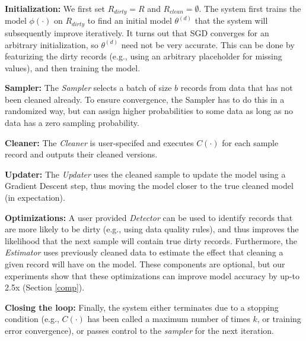 \vspace{0.25em}

\noindent \textbf{Initialization: } We first set $R_{dirty} = R$ and $R_{clean} = \emptyset$.
The system first trains the model $\phi(\cdot)$ on $R_{dirty}$ to find an initial model $\theta^{(d)}$ that the system will subsequently improve iteratively.
It turns out that SGD converges for an arbitrary initialization, so $\theta^{(d)}$ need not be very accurate. This can be done by featurizing the dirty records (e.g., using an arbitrary placeholder for missing values), and then training the model. 

\vspace{0.25em}

\noindent \textbf{Sampler: } The {\it Sampler} selects a batch of size $b$ records from data that has not been cleaned already. To ensure convergence, the Sampler has to do this in a randomized way, but can assign higher probabilities to some data as long as no data has a zero sampling probability.

\vspace{0.25em}

\noindent \textbf{Cleaner: } The {\it Cleaner} is user-specifed and executes $C(\cdot)$ for each sample record and outputs their cleaned versions.

\vspace{0.25em}

\noindent \textbf{Updater: }  The {\it Updater} uses the cleaned sample to update the model using a Gradient Descent step, thus moving the model closer to the true cleaned model (in expectation).

\vspace{0.25em}

\noindent \textbf{Optimizations: } A user provided {\it Detector} can be used to identify records that are more likely to be dirty (e.g., using data quality rules), and thus improves the likelihood that the next sample will contain true dirty records. Furthermore, the {\it Estimator} uses previously cleaned data to estimate the effect that cleaning a given record will have on the model. These components are optional, but our experiments show that these optimizations can improve model accuracy by up-to 2.5x (Section \ref{comp}).

\vspace{0.25em}

\noindent \textbf{Closing the loop: } Finally, the system either terminates due to a stopping condition (e.g., $C(\cdot)$ has been called a maximum number of times $k$, or training error convergence), or passes control to the {\it sampler} for the next iteration.

